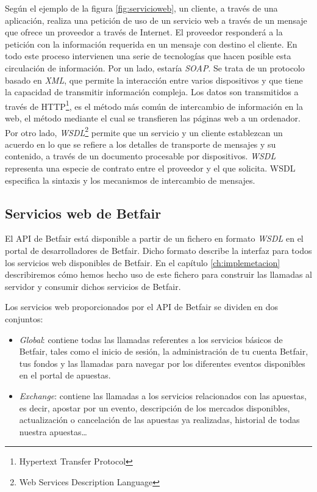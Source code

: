          Según el ejemplo de la figura \ref{fig:servicioweb}, un cliente, a través de una aplicación, realiza una petición de uso de un servicio web a través de un mensaje que ofrece un proveedor a través de Internet. El proveedor responderá a la petición con la información requerida en un mensaje con destino el cliente. En todo este proceso intervienen una serie de tecnologías que hacen posible esta circulación de información. Por un lado, estaría \emph{SOAP}. Se trata de un protocolo basado en \emph{XML}, que permite la interacción entre varios dispositivos y que tiene la capacidad de transmitir información compleja. Los datos son transmitidos a través de HTTP\footnote{Hypertext Transfer Protocol}, es el método más común de intercambio de información en la web, el método mediante el cual se transfieren las páginas web a un ordenador. 
          Por otro lado, \emph{WSDL}\footnote{Web Services Description Language} permite que un servicio y un cliente establezcan un acuerdo en lo que se refiere a los detalles de transporte de mensajes y su contenido, a través de un documento procesable por dispositivos. \emph{WSDL} representa una especie de contrato entre el proveedor y el que solicita. WSDL especifica la sintaxis y los mecanismos de intercambio de mensajes.
                    
 \subsection{Servicios web de Betfair }
 	El API de Betfair está disponible a partir de un fichero en formato \emph{WSDL} en el portal de desarrolladores de Betfair. Dicho formato describe la interfaz para todos los servicios web disponibles de Betfair. En el capítulo \ref{ch:implemetacion} describiremos cómo hemos hecho uso de este fichero para construir las llamadas al servidor y consumir dichos servicios de Betfair.

 Los servicios web proporcionados por el API de Betfair se dividen en dos conjuntos: 
          
\begin{itemize}
	\item \emph{Global}: contiene todas las llamadas referentes a los servicios básicos de Betfair, tales como el inicio de sesión, la administración de tu cuenta Betfair, tus fondos y las llamadas para navegar por los diferentes eventos disponibles en el portal de apuestas. 
	\item \emph{Exchange}: contiene las llamadas a los servicios relacionados con las apuestas, es decir, apostar por un evento, descripción de los mercados disponibles, actualización o cancelación de las apuestas ya realizadas, historial de todas nuestra apuestas\ldots 
\end{itemize}

